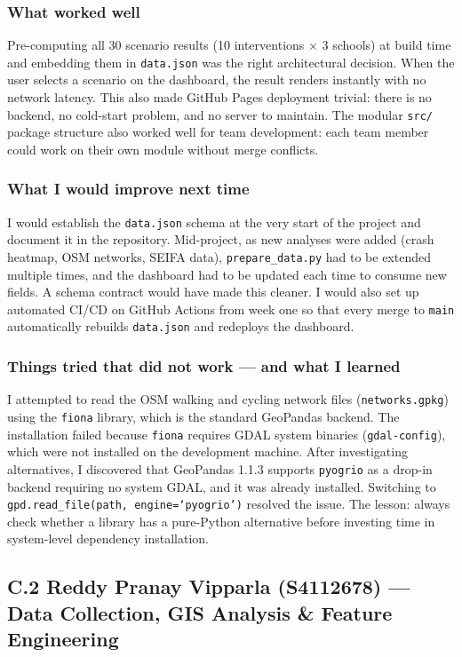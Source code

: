 \documentclass[11pt,a4paper]{article}
\begin{document}
\subsubsection*{What worked well}
Pre-computing all 30 scenario results (10 interventions × 3 schools) at build time and embedding them in \texttt{data.json} was the right architectural decision. When the user selects a scenario on the dashboard, the result renders instantly with no network latency. This also made GitHub Pages deployment trivial: there is no backend, no cold-start problem, and no server to maintain. The modular \texttt{src/} package structure also worked well for team development: each team member could work on their own module without merge conflicts.

\subsubsection*{What I would improve next time}
I would establish the \texttt{data.json} schema at the very start of the project and document it in the repository. Mid-project, as new analyses were added (crash heatmap, OSM networks, SEIFA data), \texttt{prepare\_data.py} had to be extended multiple times, and the dashboard had to be updated each time to consume new fields. A schema contract would have made this cleaner. I would also set up automated CI/CD on GitHub Actions from week one so that every merge to \texttt{main} automatically rebuilds \texttt{data.json} and redeploys the dashboard.

\subsubsection*{Things tried that did not work — and what I learned}
I attempted to read the OSM walking and cycling network files (\texttt{networks.gpkg}) using the \texttt{fiona} library, which is the standard GeoPandas backend. The installation failed because \texttt{fiona} requires GDAL system binaries (\texttt{gdal-config}), which were not installed on the development machine. After investigating alternatives, I discovered that GeoPandas 1.1.3 supports \texttt{pyogrio} as a drop-in backend requiring no system GDAL, and it was already installed. Switching to \texttt{gpd.read\_file(path, engine=`pyogrio')} resolved the issue. The lesson: always check whether a library has a pure-Python alternative before investing time in system-level dependency installation.

\bigskip
\subsection*{C.2 Reddy Pranay Vipparla (S4112678) — Data Collection, GIS Analysis \& Feature Engineering}
\end{document}
